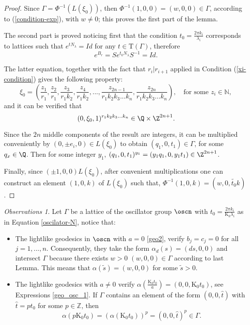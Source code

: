 \documentclass[11pt]{amsart}
\theoremstyle{plain}
\theoremstyle{definition}
\theoremstyle{remark}
\newtheorem{obs}[thm]{Observations}
\begin{document}
	\begin{proof}
		
		Since $\Gamma = \Phi^{-1}(L(\xi_0))$, then $\Phi^{-1}(1,0,0) = (w,0,0) \in \Gamma$, according to (\ref{condition-exp}), with $w \neq 0 $; this proves the first part of the lemma.
		
		The second part is proved noticing first that the condition $t_0 = \frac{2 \pi k_i}{\lambda_i}$ corresponds to lattices such that $e^{tN_\lambda} = Id$ for any $t \in \mathrm{T}(\Gamma)$, therefore $$e^{B_r} = Se^{t_0N_\lambda}S^{-1}=Id.$$
		
		The latter equation, together with the fact that $r_i | r_{i+1}$ applied in Condition (\ref{xi-condition}) gives the following property: $$\xi_0=(\frac{z_1}{r_1},\frac{z_2}{r_1}, \frac{z_3}{r_1 k_2}, \frac{z_4}{r_1 k_2}, ..., \frac{z_{2n-1}}{r_1 k_2 k_3 ... k_n}, \frac{z_{2n}}{r_1 k_2 k_3 ... k_n} ), \quad \mbox{for some } z_i \in \mathbb{N},$$ and it can be verified that $$(0,\xi_0,1)^{r_1 k_2 k_3 ... k_n} \in \Q \times \Z^{2n+1}. $$
		
		Since the $2n$ middle components of the result are integers, it can be multiplied conveniently by $(0, \pm e_i, 0) \in L(\xi_0)$ to obtain $(q_1, 0, t_1) \in \Gamma$, for some $q_x \in \Q$. Then for some integer $y_1$, $(q_1, 0, t_1)^{y_1} = (y_1 q_1, 0, y_1 t_1) \in \Z^{2n+1}$. 
		
		Finally, since $(\pm 1,0,0) L(\xi_0)$, after convenient multiplications one can construct an element $(1,0,k)$ of $L(\xi_0)$ such that, $\Phi^{-1}(1,0,k) = (w,0,\widetilde{t_0} k)$. 
		\end{proof}
	
	
	\begin{obs}\label{obs-osc}
		Let $\Gamma$ be a lattice of the oscillator group $\oscn$ with $t_0=\frac{2\pi k_i}{\mathrm{K_0} \lambda_i}$ as in Equation \eqref{oscilator-N}, notice that:
		\begin{itemize}
			\item The lightlike geodesics in $\oscn$ with $a=0$ \eqref{geo2}, verify $b_j=c_j=0$ for all $j=1,...,n$. Consequently, they take the form $ \alpha_d(s)=(ds,0,0)$ and intersect $\Gamma$ because there exists $w > 0$ $(w,0,0) \in \Gamma$ according to last Lemma. This means that  $\alpha(\tilde{s})=(w,0,0)$ for some $\tilde{s} > 0$.
			\item The lightlike geodesics with $a \neq 0$ verify $\alpha(\frac{\mathrm{K_0} t_0}{a}) = (0,0,\mathrm{K_0} t_0)$, see Expressions \eqref{geo_osc_1}. If $\Gamma$ contains an element of the form $(0,0,\hat{t})$ with $\hat{t}=p t_0$ for some $p \in \mathbb{Z}$, then $$\alpha(p \mathrm{K_0} t_0) = (\alpha(\mathrm{K_0} t_0))^p = (0,0,\hat{t})^p \in \Gamma.$$ 
		\end{itemize}
	\end{obs}	
		
\end{document}
